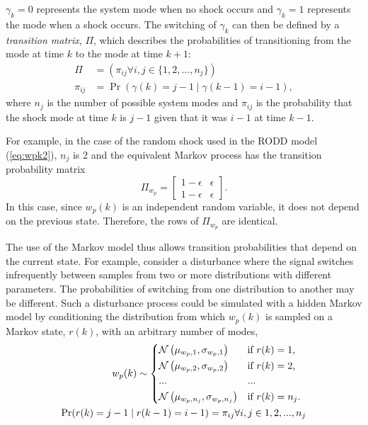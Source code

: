 $\gamma_k=0$ represents the system mode when no shock occurs and $\gamma_k=1$ represents the mode when a shock occurs. The switching of $\gamma_k$ can then be defined by a \textit{transition matrix}, $\Pi$, which describes the probabilities of transitioning from the mode at time $k$ to the mode at time $k+1$:
\begin{equation} \label{eq:Pi}
	\begin{aligned}
	\Pi &= \left(\pi_{ij} \forall i,j\in \{1,2,...,n_j\}\right) \\
	\pi_{ij} &= \Pr\left( \gamma(k)=j-1 \mid \gamma(k-1)=i-1 \right),
	\end{aligned}
\end{equation}
%
%
where $n_j$ is the number of possible system modes and $\pi_{ij}$ is the probability that the shock mode at time $k$ is $j-1$ given that it was $i-1$ at time $k-1$.

For example, in the case of the random shock used in the \gls{RODD} model (\ref{eq:wpk2}), $n_j$ is 2 and the equivalent Markov process has the transition probability matrix
%
\begin{equation} \label{eq:Pi-RODD-step}
	\Pi_{w_{p}} = \begin{bmatrix}
	1-\epsilon & \epsilon \\
	1-\epsilon & \epsilon
	\end{bmatrix}.
\end{equation}
In this case, since $w_{p}(k)$ is an independent random variable, it does not depend on the previous state. Therefore, the rows of $\Pi_{w_{p}}$ are identical.

The use of the Markov model thus allows transition probabilities that depend on the current state. For example, consider a disturbance where the signal switches infrequently between samples from two or more distributions with different parameters. The probabilities of switching from one distribution to another may be different. Such a disturbance process could be simulated with a hidden Markov model by conditioning the distribution from which $w_p(k)$ is sampled on a Markov state, $r(k)$, with an arbitrary number of modes,
\begin{equation} \label{eq:mog-example}
	\begin{split}
		w_p(k) \sim 
		\begin{cases*}
			\mathcal{N}\left(\mu_{w_p,1}, \sigma_{w_p,1}\right) & if $r(k)=1$, \\
			\mathcal{N}\left(\mu_{w_p,2}, \sigma_{w_p,2}\right) & if $r(k)=2$, \\
			... & ...\\
			\mathcal{N}\left(\mu_{w_p,n_j}, \sigma_{w_p,n_j}\right) & if $r(k)=n_j$.
		\end{cases*} \\
	\Pr(r(k)=j-1 \mid r(k-1)=i-1)=\pi_{ij} \forall i,j \in {1,2,...,n_j}
	\end{split}
\end{equation}
%

